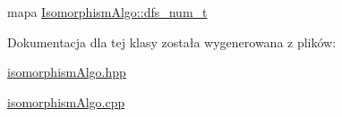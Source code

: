 mapa \hyperlink{classIsomorphismAlgo_a848c1d965a1c201d768513f756629bbe}{Isomorphism\-Algo\-::dfs\-\_\-num\-\_\-t} 



Dokumentacja dla tej klasy została wygenerowana z plików\-:\begin{DoxyCompactItemize}
\item 
\hyperlink{isomorphismAlgo_8hpp}{isomorphism\-Algo.\-hpp}\item 
\hyperlink{isomorphismAlgo_8cpp}{isomorphism\-Algo.\-cpp}\end{DoxyCompactItemize}
